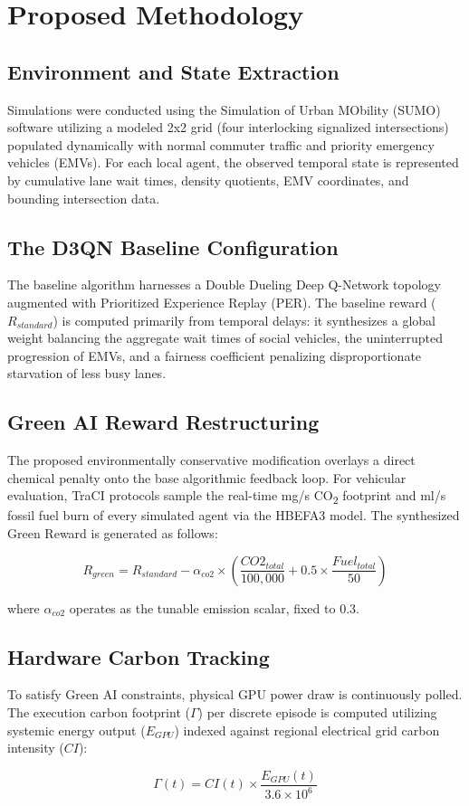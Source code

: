 \chapter{Proposed Methodology}
\label{chap:methodology}

\section{Environment and State Extraction}
Simulations were conducted using the Simulation of Urban MObility (SUMO) software utilizing a modeled 2x2 grid (four interlocking signalized intersections) populated dynamically with normal commuter traffic and priority emergency vehicles (EMVs). For each local agent, the observed temporal state is represented by cumulative lane wait times, density quotients, EMV coordinates, and bounding intersection data.

\section{The D3QN Baseline Configuration}
The baseline algorithm harnesses a Double Dueling Deep Q-Network topology augmented with Prioritized Experience Replay (PER). The baseline reward ($R_{standard}$) is computed primarily from temporal delays: it synthesizes a global weight balancing the aggregate wait times of social vehicles, the uninterrupted progression of EMVs, and a fairness coefficient penalizing disproportionate starvation of less busy lanes.

\section{Green AI Reward Restructuring}
The proposed environmentally conservative modification overlays a direct chemical penalty onto the base algorithmic feedback loop. For vehicular evaluation, TraCI protocols sample the real-time mg/s CO\textsubscript{2} footprint and ml/s fossil fuel burn of every simulated agent via the HBEFA3 model. The synthesized Green Reward is generated as follows:

\begin{equation}
R_{green} = R_{standard} - \alpha_{co2} \times \left( \frac{CO2_{total}}{100,000} + 0.5 \times \frac{Fuel_{total}}{50} \right)
\end{equation}

where $\alpha_{co2}$ operates as the tunable emission scalar, fixed to 0.3.

\section{Hardware Carbon Tracking}
To satisfy Green AI constraints, physical GPU power draw is continuously polled. The execution carbon footprint ($\Gamma$) per discrete episode is computed utilizing systemic energy output ($E_{GPU}$) indexed against regional electrical grid carbon intensity ($CI$):

\begin{equation}
\Gamma(t) = CI(t) \times \frac{E_{GPU}(t)}{3.6 \times 10^6}
\end{equation}
